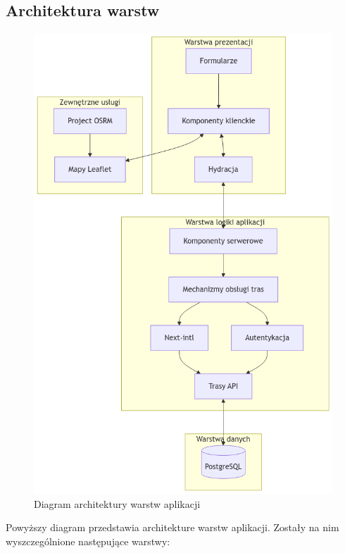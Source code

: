 \subsection{Architektura warstw}
\begin{figure}[H]
	\centering
		\includegraphics[width=0.7\linewidth]{rozdzial2/diagram_warstw.png}
	\caption{Diagram architektury warstw aplikacji}
	\label{Diagram warstw}
\end{figure}
Powyższy diagram przedstawia architekture warstw aplikacji. Zostały na nim wyszczególnione następujące warstwy:
